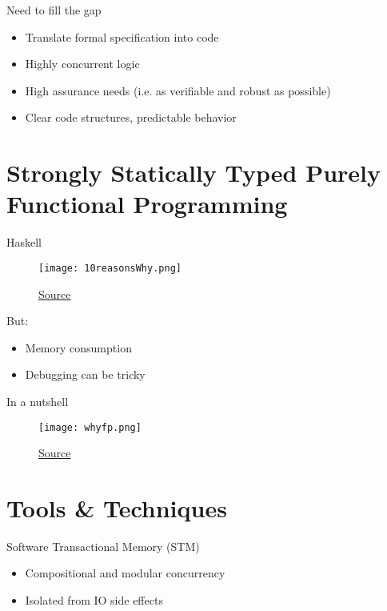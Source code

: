 \documentclass{beamer}
\begin{document}
\begin{frame}{Need to fill the gap}
  \begin{itemize}
    \item Translate formal specification into code
    \item Highly concurrent logic
    \item High assurance needs (i.e. as verifiable and robust as possible)
    \item Clear code structures, predictable behavior
  \end{itemize}
\end{frame}

\section{Strongly Statically Typed Purely Functional Programming}

\begin{frame}{Haskell}
  \begin{figure}
    \centering
    \texttt{[image: 10reasonsWhy.png]}
    \caption{\href{https://imgur.com/i0wTFSO.png}{Source}}
  \end{figure}

  But:
  \begin{itemize}
    \item Memory consumption
    \item Debugging can be tricky
  \end{itemize}
\end{frame}

\begin{frame}{In a nutshell}
  \begin{figure}
    \centering
    \texttt{[image: whyfp.png]}
    \caption{\href{https://imgur.com/EeMZL0I.png}{Source}}
  \end{figure}
\end{frame}

\section{Tools \& Techniques}

\begin{frame}{Software Transactional Memory (STM)}
  \begin{itemize}
    \item Compositional and modular concurrency
    \item Isolated from IO side effects
  \end{itemize}
\end{frame}
\end{document}
